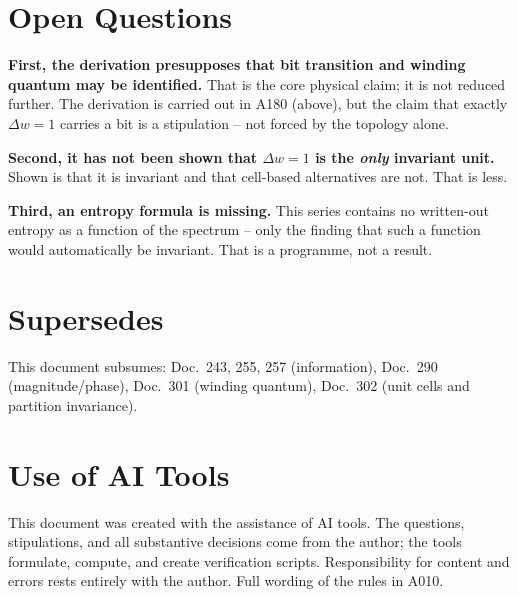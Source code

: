 \section{Open Questions}

\textbf{First, the derivation presupposes that bit transition and winding quantum
may be identified.} That is the core physical claim; it is not reduced further.
The derivation is carried out in A180 (above), but the claim that exactly
$\Delta w=1$ carries a bit is a stipulation -- not forced by the topology alone.

\textbf{Second, it has not been shown that $\Delta w=1$ is the \emph{only}
invariant unit.} Shown is that it is invariant and that cell-based alternatives
are not. That is less.

\textbf{Third, an entropy formula is missing.} This series contains no written-out
entropy as a function of the spectrum -- only the finding that such a function would
automatically be invariant. That is a programme, not a result.

\section{Supersedes}

This document subsumes: Doc.~243, 255, 257 (information), Doc.~290
(magnitude/phase), Doc.~301 (winding quantum), Doc.~302 (unit cells and
partition invariance).

\section{Use of AI Tools}

This document was created with the assistance of AI tools. The questions,
stipulations, and all substantive decisions come from the author; the tools
formulate, compute, and create verification scripts.
Responsibility for content and errors rests entirely with the author.
Full wording of the rules in A010.
